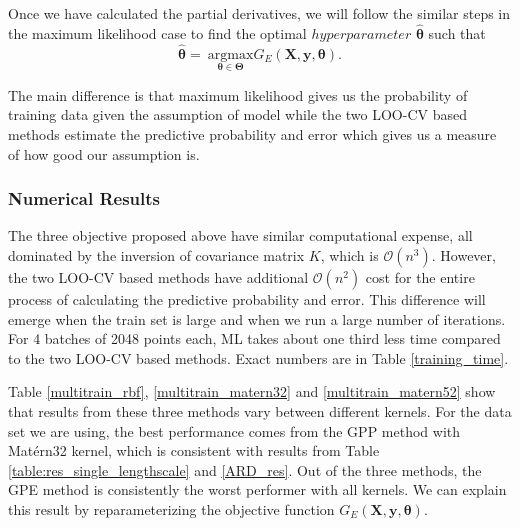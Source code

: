 \documentclass[11pt,a4paper]{article}
\theoremstyle{definition}
\numberwithin{equation}{section}
\let\vec\mathbf
\begin{document}
	Once we have calculated the partial derivatives, we will follow the similar steps in the maximum likelihood case to find the optimal $hyperparameter$ $\hat{\vec \theta}$ such that
	\begin{equation}
	\vec{\hat \theta} = \ \underset{\vec \theta \in \vec \Theta}{\mathrm{argmax}}G_E(\vec X,\vec y, \vec \theta).
	\end{equation}
	
	The main difference is that maximum likelihood gives us the probability of training data given the assumption of model while the two LOO-CV based methods estimate the predictive probability and error which gives us a measure of how good our assumption is. 

\subsubsection{Numerical Results}\label{subsec:num_res}
	The three objective proposed above have similar computational expense, all dominated by the inversion of covariance matrix $K$, which is $\mathcal O(n^3)$. However, the two LOO-CV based methods have additional $\mathcal O(n^2)$ cost for the entire process of calculating the predictive probability and error. This difference will emerge when the train set is large and when we run a large number of iterations. For 4 batches of 2048 points each, ML takes about one third less time compared to the two LOO-CV based methods. Exact numbers are in Table \ref*{training_time}.
	
	Table \ref*{multitrain_rbf}, \ref{multitrain_matern32} and \ref{multitrain_matern52} show that results from these three methods vary between different kernels. For the data set we are using, the best performance comes from the GPP method with Mat\'ern32 kernel, which is consistent with results from Table \ref{table:res_single_lengthscale} and \ref{ARD_res}. Out of the three methods, the GPE method is consistently the worst performer with all kernels. We can explain this result by reparameterizing the objective function $G_E(\vec X,\vec y, \vec \theta)$. 
	
\end{document}
